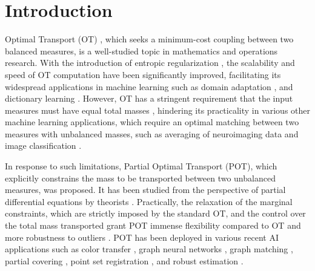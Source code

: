 \section{Introduction}
Optimal Transport (OT) \cite{Villani-09-Optimal, Kantorovich-1942-Translocation}, which seeks a minimum-cost coupling between two balanced measures, is a well-studied topic in mathematics and operations research. With the introduction of entropic regularization  \cite{Cuturi-2013-Sinkhorn}, the scalability and speed of OT computation have been significantly improved, facilitating its widespread applications in machine learning such as domain adaptation \citep{Courty-2017-Optimal}, and dictionary learning \citep{pmlr-v51-rolet16}. 
However, OT has a stringent requirement that the input measures must have equal total masses  \citep{Chizat_2015}, hindering its practicality in various other machine learning applications, which require an optimal matching between two measures with unbalanced masses, such as averaging of neuroimaging data \citep{Gramfort_2015} and image classification \citep{Pele2008ALT, rubner2000earth}.

In response to such limitations, Partial Optimal Transport (POT), which explicitly constrains the mass to be transported between two unbalanced measures, was proposed. It has been studied from the perspective of partial differential equations by theorists \cite{figalli2010optimal, Caffarelli_2010}. Practically, the relaxation of the marginal constraints, which are strictly imposed by the standard OT, and the control over the total mass transported grant POT immense flexibility compared to OT \citep{Chapel-nips2020} and more robustness to outliers \citep{nhatho-mmpot}. POT has been deployed in various recent AI applications such as color transfer \citep{Bonneel_2019}, graph neural networks \citep{Sarlin_2019}, graph matching \cite{Liu_2020},  partial covering \citep{Kawano_2021}, point set registration \citep{Wang_2022}, and robust estimation \citep{nietert2023robust}.   

